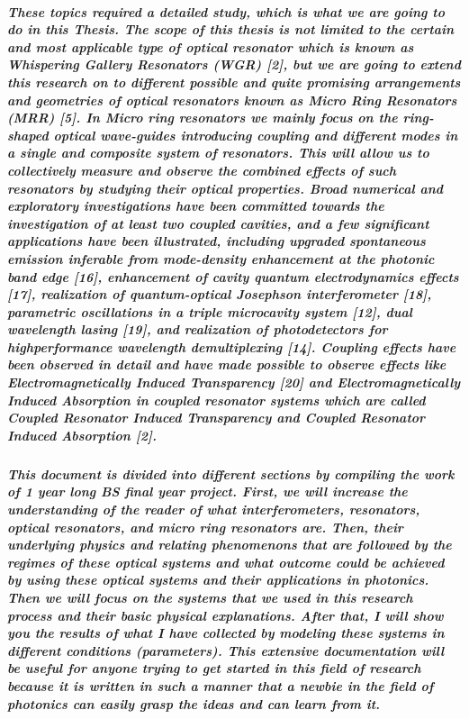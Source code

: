 \subparagraph{\normalfont \large These topics required a detailed study, which is what we are going to do in this Thesis. The scope of this thesis is not limited to the certain and most applicable type of optical resonator which is known as Whispering Gallery Resonators (WGR) [2], but we are going to extend this research on to different possible and quite promising arrangements and geometries of optical resonators known as Micro Ring Resonators (MRR) [5]. In Micro ring resonators we mainly focus on the ring-shaped optical wave-guides introducing coupling and different modes in a single and composite system of resonators. This will allow us to collectively measure and observe the combined effects of such resonators by studying their optical properties. Broad numerical and exploratory investigations have been committed towards the investigation of at least two coupled cavities, and a few significant applications have been illustrated, including upgraded spontaneous emission inferable from mode-density enhancement at the photonic band edge [16], enhancement of cavity quantum electrodynamics effects [17], realization of
quantum-optical Josephson interferometer [18], parametric oscillations in a triple microcavity
system [12], dual wavelength lasing [19], and realization of photodetectors for highperformance wavelength demultiplexing [14]. Coupling effects have been observed in detail and have made possible to observe effects like Electromagnetically Induced Transparency [20] and Electromagnetically Induced Absorption in coupled resonator systems which are called Coupled Resonator Induced Transparency and Coupled Resonator Induced Absorption [2].}
\subparagraph{\normalfont \large This document is divided into different sections by compiling the work of 1 year long BS final year project. First, we will increase the understanding of the reader of what interferometers, resonators, optical resonators, and micro ring resonators are. Then, their underlying physics and relating phenomenons that are followed by the regimes of these optical systems and what outcome could be achieved by using these optical systems and their applications in photonics. Then we will focus on the systems that we used in this research process and their basic physical explanations. After that, I will show you the results of what I have collected by modeling these systems in different conditions (parameters). This extensive documentation will be useful for anyone trying to get started in this field of research because it is written in such a manner that a newbie in the field of photonics can easily grasp the ideas and can learn from it. }

